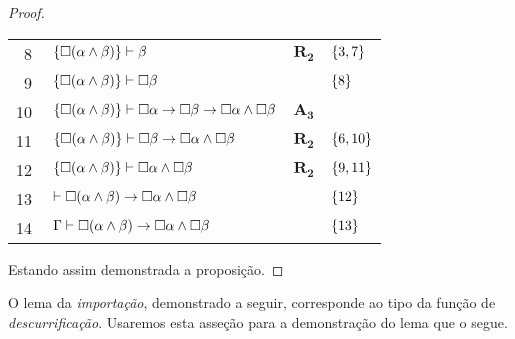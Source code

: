 \begin{tcolorbox}[enhanced jigsaw, breakable, sharp corners, colframe=black, colback=white, boxrule=0.5pt, left=1.5mm, right=1.5mm, top=1.5mm, bottom=1.5mm]
\begin{lemma}
\begin{proof}
\begin{xltabular}{\textwidth}{r | X l l}
            \scriptsize{\phantom{0}8}\phantom{ } & $\ \set{\nec(\alpha\wedge\beta)}\vdash\beta$                                              & $\hyperref[modal.rule.2]{\mathbf{R_2}}$        & $\left\{3,7\right\}$\\[\rowskip]
            \scriptsize{\phantom{0}9}\phantom{ } & $\ \set{\nec(\alpha\wedge\beta)}\vdash\nec\beta$                                          &                       & $\left\{8\right\}$\\[\rowskip]
            \scriptsize{10}\phantom{ }           & $\ \set{\nec(\alpha\wedge\beta)}\vdash\nec\alpha\to\nec\beta\to\nec\alpha\wedge\nec\beta$ & $\hyperref[modal.axiom.3]{\mathbf{A_3}}$       & \\[\rowskip]
            \scriptsize{11}\phantom{ }           & $\ \set{\nec(\alpha\wedge\beta)}\vdash\nec\beta\to\nec\alpha\wedge\nec\beta$              & $\hyperref[modal.rule.2]{\mathbf{R_2}}$        & $\left\{6,10\right\}$\\[\rowskip]
            \scriptsize{12}\phantom{ }           & $\ \set{\nec(\alpha\wedge\beta)}\vdash\nec\alpha\wedge\nec\beta$                          & $\hyperref[modal.rule.2]{\mathbf{R_2}}$        & $\left\{9,11\right\}$\\[\rowskip]
            \scriptsize{13}\phantom{ }           & $\ \vdash\nec(\alpha\wedge\beta)\to\nec\alpha\wedge\nec\beta$                             &                            & $\left\{12\right\}$\\[\rowskip]
            \scriptsize{14}\phantom{ }           & $\ \Gamma\vdash\nec(\alpha\wedge\beta)\to\nec\alpha\wedge\nec\beta$                       &                            & $\left\{13\right\}$
        \end{xltabular}
        \normalsize

        \vspace{0.5\baselineskip}
        Estando assim demonstrada a proposição.
        \end{proof}
    \end{lemma}
\end{tcolorbox}

\vspace{.5\baselineskip}
O lema da \emph{importação}, demonstrado a seguir, corresponde ao tipo da função de \emph{descurrificação}.
Usaremos esta asseção para a demonstração do lema que o segue.

